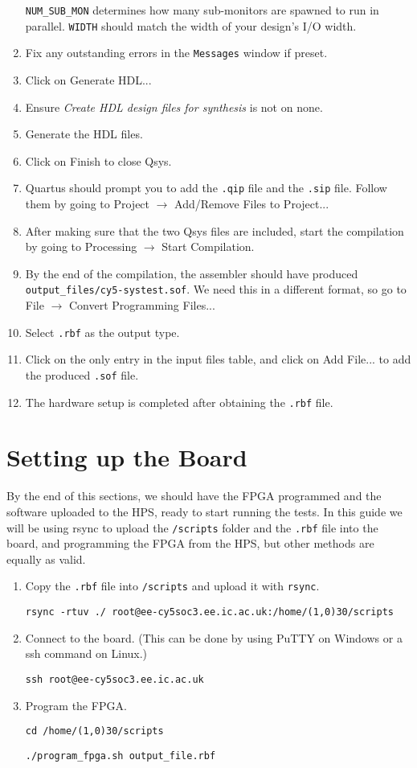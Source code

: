 \begin{enumerate}
        \texttt{NUM\_SUB\_MON} determines how many sub-monitors are spawned to run in parallel.
        \texttt{WIDTH} should match the width of your design's I/O width.
  \item Fix any outstanding errors in the \texttt{Messages} window if preset.
  \item Click on Generate HDL...
  \item Ensure \textit{Create HDL design files for synthesis} is not on none.
  \item Generate the HDL files.
  \item Click on Finish to close Qsys.
  \item Quartus should prompt you to add the \texttt{.qip} file and the \texttt{.sip} file.
        Follow them by going to Project $\rightarrow$ Add/Remove Files to Project...
  \item After making sure that the two Qsys files are included, start the compilation by going to Processing $\rightarrow$ Start Compilation.
  \item By the end of the compilation, the assembler should have produced \texttt{output\_files/cy5-systest.sof}.
        We need this in a different format, so go to File $\rightarrow$ Convert Programming Files...
  \item Select \texttt{.rbf} as the output type.
  \item Click on the only entry in the input files table, and click on Add File... to add the produced \texttt{.sof} file.
  \item The hardware setup is completed after obtaining the \texttt{.rbf} file.
\end{enumerate}

\section{Setting up the Board}
By the end of this sections, we should have the FPGA programmed and the software uploaded to the HPS, ready to start running the tests.
In this guide we will be using rsync to upload the \texttt{/scripts} folder and the \texttt{.rbf} file into the board, and programming the FPGA from the HPS, but other methods are equally as valid.

\begin{enumerate}
  \item Copy the \texttt{.rbf} file into \texttt{/scripts} and upload it with \texttt{rsync}.

  \texttt{rsync -rtuv ./ root@ee-cy5soc3.ee.ic.ac.uk:/home/\line(1,0){30}/scripts}
  \item Connect to the board.
        (This can be done by using PuTTY on Windows or a ssh command on Linux.)

  \texttt{ssh root@ee-cy5soc3.ee.ic.ac.uk}
  \item Program the FPGA.

  \texttt{cd /home/\line(1,0){30}/scripts}

  \texttt{./program\_fpga.sh output\_file.rbf}
\end{enumerate}



